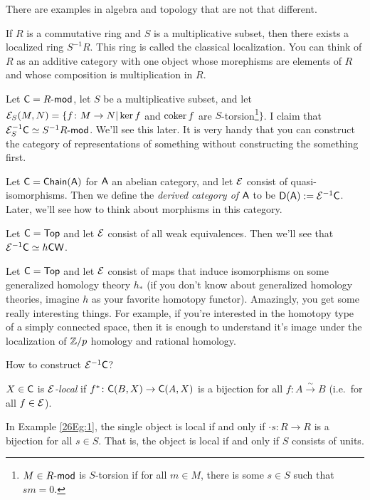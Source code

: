 There are examples in algebra and topology that are not that different.
\begin{example} \label{26Eg:1}
 If $R$ is a commutative ring and $S$ is a multiplicative subset, then there exists a localized ring $S^{-1}R$. This ring is called the classical localization. You can think of $R$ as an additive category with one object whose morephisms are elements of $R$ and whose composition is multiplication in $R$.
\end{example}
\begin{example}\label{26Eg:2}
 Let $\C=R\mod$, let $S$ be a multiplicative subset, and let $\E_S(M,N)=\{f\colon M\to N|\ker f$ and $\coker f$ are $S$-torsion\footnote{$M\in R\mod$ is $S$-torsion if for all $m\in M$, there is some $s\in S$ such that $sm=0$.}$\}$. I claim that $\E_S^{-1}\C\simeq S^{-1}R\mod$. We'll see this later. It is very handy that you can construct the category of representations of something without constructing the something first.
\end{example}
\begin{example}\label{26Eg:3}
 Let $\C=\chain(\A)$ for $\A$ an abelian category, and let $\E$ consist of quasi-isomorphisms. Then we define the \emph{derived category of $\A$} to be $\D(\A):=\E^{-1}\C$. Later, we'll see how to think about morphisms in this category.
\end{example}
\begin{example}\label{26Eg:4}
 Let $\C=\top$ and let $\E$ consist of all weak equivalences. Then we'll see that $\E^{-1}\C\simeq h\cw$.
\end{example}
\begin{example}\label{26Eg:5}
 Let $\C=\top$ and let $\E$ consist of maps that induce isomorphisms on some generalized homology theory $h_*$ (if you don't know about generalized homology theories, imagine $h$ as your favorite homotopy functor). Amazingly, you get some really interesting things. For example, if you're interested in the homotopy type of a simply connected space, then it is enough to understand it's image under the localization of $\ZZ/p$ homology and rational homology.
\end{example}

How to construct $\E^{-1}\C$?
\begin{definition}
 $X\in \C$ is \emph{$\E$-local} if $f^*\colon\C(B,X)\to \C(A,X)$ is a bijection for all $f\colon A\xrightarrow\sim B$ (i.e.~for all $f\in \E$).
\end{definition}
In Example \ref{26Eg:1}, the single object is local if and only if $\cdot s\colon R\to R$ is a bijection for all $s\in S$. That is, the object is local if and only if $S$ consists of units.

